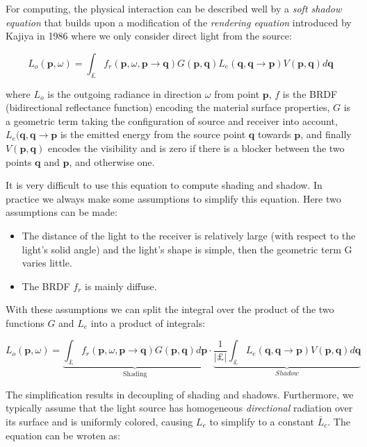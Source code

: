 For computing, the physical interaction can be described well by a \textit{soft shadow equation} that builds upon a modification of the \textit{rendering equation} introduced by Kajiya in 1986\cite{a:TheRenderingEquation} where we only consider direct light from the source:

\begin{equation}
	L_{o}(\mathbf{p},\omega)=\int_{\pounds}f_{r}(\mathbf{p},\omega,\mathbf{p}\rightarrow\mathbf{q})G(\mathbf{p},\mathbf{q})L_{e}(\mathbf{q},\mathbf{q}\rightarrow\mathbf{p})V(\mathbf{p},\mathbf{q})d\mathbf{q}
\end{equation}

where $L_{o}$ is the outgoing radiance in direction $\omega$ from point $\mathbf{p}$, $f$ is the BRDF (bidirectional reflectance function) encoding the material surface properties, $G$ is a geometric term taking the configuration of source and receiver into account, $L_{e}(\mathbf{q},\mathbf{q}\rightarrow\mathbf{p}$ is the emitted energy from the source point $\mathbf{q}$ towards $\mathbf{p}$, and finally $V(\mathbf{p},\mathbf{q})$ encodes the visibility and is zero if there is a blocker between the two points $\mathbf{q}$ and $\mathbf{p}$, and otherwise one.

It is very difficult to use this equation to compute shading and shadow. In practice we always make some assumptions to simplify this equation. Here two assumptions can be made:

\begin{itemize}
	\item The distance of the light to the receiver is relatively large (with respect to the light’s solid angle) and the light’s shape is simple, then the geometric term G varies little.
	\item The BRDF $f_{r}$ is mainly diffuse.
\end{itemize}

With these assumptions we can split the integral over the product of the two functions $G$ and $L_{e}$ into a product of integrals:

\begin{equation}
	L_{o}(\mathbf{p},\omega)=\underbrace{\int_{\pounds}f_{r}(\mathbf{p},\omega,\mathbf{p}\rightarrow\mathbf{q})G(\mathbf{p},\mathbf{q})d\mathbf{p}}_{\text{Shading}}\cdot\underbrace{\frac{1}{|\pounds|} \int_{\pounds} L_{e}(\mathbf{q},\mathbf{q}\rightarrow\mathbf{p})V(\mathbf{p},\mathbf{q})d\mathbf{q}}_{Shadow}
\end{equation} 
 
The simplification results in decoupling of shading and shadows.
Furthermore, we typically assume that the light source has homogeneous \textit{directional} radiation over its surface and is uniformly colored, causing $L_{e}$ to simplify to a constant $\bar{L}_{c}$. The equation can be wroten as:

